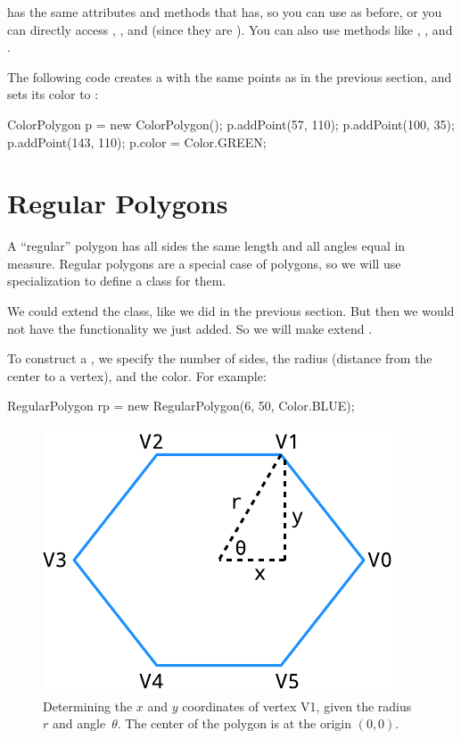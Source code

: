  has the same attributes and methods that  has, so you can use  as before, or you can directly access , , and  (since they are ).
You can also use methods like , , and .

The following code creates a  with the same points as in the previous section, and sets its color to :

\begin{code}
ColorPolygon p = new ColorPolygon();
p.addPoint(57, 110);
p.addPoint(100, 35);
p.addPoint(143, 110);
p.color = Color.GREEN;
\end{code}


\section{Regular Polygons}

A ``regular'' polygon has all sides the same length and all angles equal in measure.
Regular polygons are a special case of polygons, so we will use specialization to define a class for them.

We could extend the  class, like we did in the previous section.
But then we would not have the  functionality we just added.
So we will make  extend .

To construct a , we specify the number of sides, the radius (distance from the center to a vertex), and the color.
For example:

\begin{code}
RegularPolygon rp = new RegularPolygon(6, 50, Color.BLUE);
\end{code}

\begin{figure}[!ht]
\begin{center}
\includegraphics{figs/hexagon.pdf}
\caption{Determining the $x$ and $y$ coordinates of vertex V1, given the radius~$r$ and angle~$\theta$. The center of the polygon is at the origin $(0, 0)$.}
\label{fig:hexagon}
\end{center}
\end{figure}

